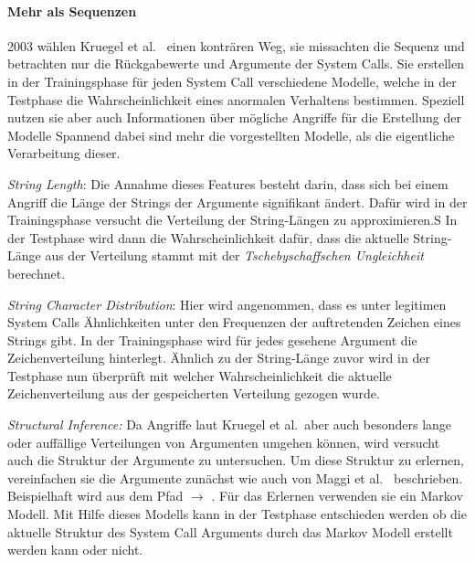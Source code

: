     \paragraph{Mehr als Sequenzen}

        2003 wählen Kruegel et al.~\cite{ARGUMENTS} einen konträren Weg, sie missachten die Sequenz und betrachten nur die Rückgabewerte und Argumente der System Calls.
        Sie erstellen in der Trainingsphase für jeden System Call verschiedene Modelle, welche in der Testphase die Wahrscheinlichkeit eines anormalen Verhaltens bestimmen.
        Speziell nutzen sie aber auch Informationen über mögliche Angriffe für die Erstellung der Modelle
        Spannend dabei sind mehr die vorgestellten Modelle, als die eigentliche Verarbeitung dieser.

        \textit{String Length}: Die Annahme dieses Features besteht darin, dass sich bei einem Angriff die Länge der Strings der Argumente signifikant ändert.
        Dafür wird in der Trainingsphase versucht die Verteilung der String-Längen zu approximieren.S
        In der Testphase wird dann die Wahrscheinlichkeit dafür, dass die aktuelle String-Länge aus der Verteilung stammt mit der \textit{Tschebyschaffschen Ungleichheit} berechnet.
        
        \textit{String Character Distribution}: Hier wird angenommen, dass es unter legitimen System Calls Ähnlichkeiten unter den Frequenzen der auftretenden Zeichen eines Strings gibt.
        In der Trainingsphase wird für jedes gesehene Argument die Zeichenverteilung hinterlegt.
        Ähnlich zu der String-Länge zuvor wird in der Testphase nun überprüft mit welcher Wahrscheinlichkeit die aktuelle Zeichenverteilung aus der gespeicherten Verteilung gezogen wurde.

        \textit{Structural Inference:} Da Angriffe laut Kruegel et al.\ aber auch besonders lange oder auffällige Verteilungen von Argumenten umgehen können, wird versucht auch die Struktur der Argumente zu untersuchen.
        Um diese Struktur zu erlernen, vereinfachen sie die Argumente zunächst wie auch von Maggi et al.~\cite{ARGUMENTS2} beschrieben.
        Beispielhaft wird aus dem Pfad  $\longrightarrow$ .
        Für das Erlernen verwenden sie ein Markov Modell.
        Mit Hilfe dieses Modells kann in der Testphase entschieden werden ob die aktuelle Struktur des System Call Arguments durch das Markov Modell erstellt werden kann oder nicht.

